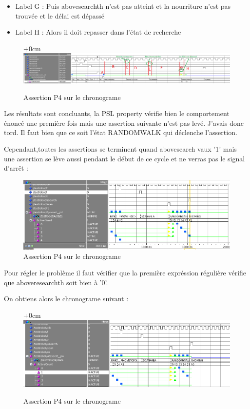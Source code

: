 \documentclass{article}
\begin{document}
\begin{landscape}
\begin{itemize}
\item Label G :  Puis abovesearchth n'est pas atteint et la nourriture n'est pas trouvée
et le délai est dépassé 

\item Label H : Alors il doit repasser dans l'état de recherche


\end{itemize}

\begin{figure}[!h]
\advance\leftskip+0cm
\includegraphics[scale=0.56]{PSL/P4-2.PNG}
\caption{Assertion P4 sur le chronograme }
\end{figure}

Les résultats sont concluants, la PSL property vérifie bien le comportement énoncé une première fois mais une assertion suivante n'est pas levé. J'avais donc tord. Il faut bien que ce soit l'état RANDOMWALK qui déclenche l'assertion. 

\newpage
\end{landscape}

Cependant,toutes les assertions se terminent quand abovesearch vaux '1' mais une assertion se lève aussi pendant le début de ce cycle et ne verras pas le signal d'arrêt :


\begin{figure}[!h]
\centering
\includegraphics[scale=0.5]{PSL/P4-3.PNG}
\caption{Assertion P4 sur le chronograme }
\end{figure}

Pour régler le problème il faut vérifier que la première expréssion régulière vérifie que aboveresearchth soit bien à '0'.

On obtiens alors le chronograme suivant : 

\begin{figure}[!h]
\advance\leftskip+0cm
\includegraphics[scale=0.45]{PSL/P4-4.PNG}
\caption{Assertion P4 sur le chronograme }
\end{figure}
\end{document}
